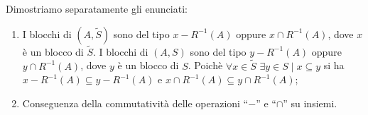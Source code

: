 \begin{proof2}
    Dimostriamo separatamente gli enunciati:
    \begin{enumerate}
        \item I blocchi di \splitfunc$(A,\widetilde{S})$ sono del tipo $x - R^{-1}(A)$ oppure $x \cap R^{-1}(A)$, dove $x$ è un blocco di $\widetilde{S}$. I blocchi di \splitfunc$(A,S)$ sono del tipo $y - R^{-1}(A)$ oppure $y \cap R^{-1}(A)$, dove $y$ è un blocco di $S$. Poichè $\forall x \in \widetilde{S} \,\,\exists y \in S \mid x \subseteq y$ si ha $x - R^{-1}(A) \subseteq y - R^{-1}(A)$ e $x \cap R^{-1}(A) \subseteq y \cap R^{-1}(A)$;
        \item Conseguenza della commutatività delle operazioni ``$-$'' e ``$\cap$'' su insiemi.
    \end{enumerate}
    \vspace*{-0.75cm}
\end{proof2}

